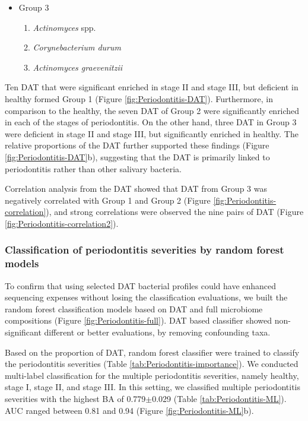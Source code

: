 \documentclass[11pt, a4paper, onecolumn, oneside]{report}
\begin{document}
\begin{itemize}
                    \item Group 3
                    \begin{enumerate}
                        \item \textit{Actinomyces} spp.
                        \item \textit{Corynebacterium durum}
                        \item \textit{Actinomyces graevenitzii}
                    \end{enumerate}
                \end{itemize}

                Ten DAT that were significant enriched in stage II and stage III, but deficient in healthy formed Group 1 (Figure \ref{fig:Periodontitis-DAT}). Furthermore, in comparison to the healthy, the seven DAT of Group 2 were significantly enriched in each of the stages of periodontitis. On the other hand, three DAT in Group 3 were deficient in stage II and stage III, but significantly enriched in healthy. The relative proportions of the DAT further supported these findings (Figure \ref{fig:Periodontitis-DAT}b), suggesting that the DAT is primarily linked to periodontitis rather than other salivary bacteria.

                Correlation analysis from the DAT showed that DAT from Group 3 was negatively correlated with Group 1 and Group 2 (Figure \ref{fig:Periodontitis-correlation}), and strong correlations were observed the nine pairs of DAT (Figure \ref{fig:Periodontitis-correlation2}).

            \subsubsection{Classification of periodontitis severities by random forest models}
                To confirm that using selected DAT bacterial profiles could have enhanced sequencing expenses without losing the classification evaluations, we built the random forest classification models based on DAT and full microbiome compositions (Figure \ref{fig:Periodontitis-full}). DAT based classifier showed non-significant different or better evaluations, by removing confounding taxa.

                Based on the proportion of DAT, random forest classifier were trained to classify the periodontitis severities (Table \ref{tab:Periodontitis-importance}). We conducted multi-label classification for the multiple periodontitis severities, namely healthy, stage I, stage II, and stage III. In this setting, we classified multiple periodontitis severities with the highest BA of 0.779$\pm$0.029 (Table \ref{tab:Periodontitis-ML}). AUC ranged between 0.81 and 0.94 (Figure \ref{fig:Periodontitis-ML}b).
\end{document}
